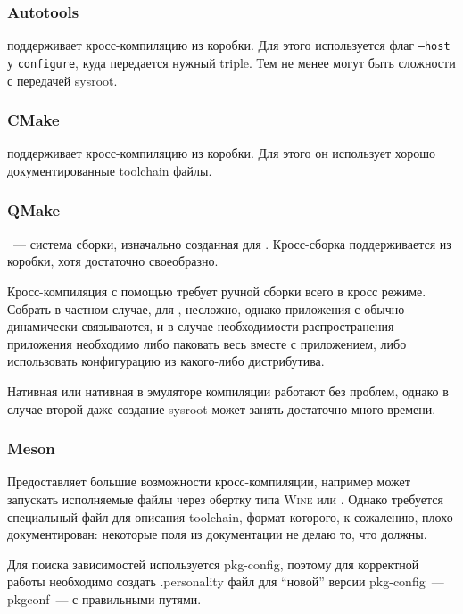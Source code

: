 \subsubsection{Autotools}

\autotools{} поддерживает кросс-компиляцию из коробки.
Для этого используется флаг \texttt{--host} у \texttt{configure}, куда передается нужный triple.
Тем не менее могут быть сложности с передачей sysroot.

\subsubsection{CMake}

\cmake{} поддерживает кросс-компиляцию из коробки.
Для этого он использует хорошо документированные toolchain файлы.

\subsubsection{QMake}

\qmake{}~--- система сборки, изначально созданная для \qt{}.
Кросс-сборка поддерживается из коробки, хотя достаточно своеобразно.

Кросс-компиляция с помощью \qmake{} требует ручной сборки всего \qt{} в кросс режиме.
Собрать \qt{} в частном случае, для \ci{}, несложно, однако приложения с \qt{} обычно динамически связываются, и в случае необходимости распространения приложения необходимо либо паковать весь \qt{} вместе с приложением, либо использовать конфигурацию из какого-либо дистрибутива.

Нативная или нативная в эмуляторе компиляции работают без проблем, однако в случае второй даже создание sysroot может занять достаточно много времени.

\subsubsection{Meson}

Предоставляет большие возможности кросс-компиляции, например может запускать исполняемые файлы через обертку типа \textsc{Wine} или \qemu{}.
Однако требуется специальный файл для описания toolchain, формат которого, к сожалению, плохо документирован: некоторые поля из документации не делаю то, что должны.

Для поиска зависимостей используется pkg-config, поэтому для корректной работы необходимо создать .personality файл для \enquote{новой} версии pkg-config~--- pkgconf~--- с правильными путями.

